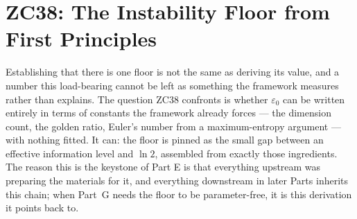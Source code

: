 \documentclass[12pt, a4paper]{article}
\begin{document}
\section{ZC38: The Instability Floor from First Principles}
\label{sec:zc38-ieff}

Establishing that there is one floor is not the same as deriving its value, and
a number this load-bearing cannot be left as something the framework measures
rather than explains. The question ZC38 confronts is whether $\varepsilon_0$ can
be written entirely in terms of constants the framework already forces --- the
dimension count, the golden ratio, Euler's number from a maximum-entropy
argument --- with nothing fitted. It can: the floor is pinned as the small gap
between an effective information level and $\ln 2$, assembled from exactly those
ingredients. The reason this is the keystone of Part E is that everything
upstream was preparing the materials for it, and everything downstream in later
Parts inherits this chain; when Part~G needs the floor to be parameter-free, it
is this derivation it points back to.



\sloppy

\end{document}
